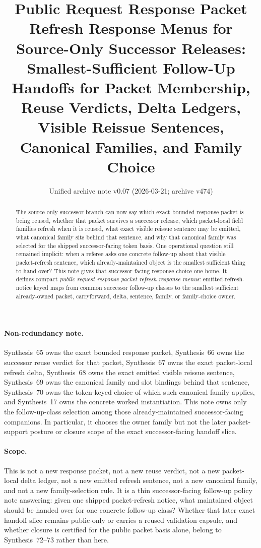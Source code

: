 \documentclass[11pt]{article}
\title{Public Request Response Packet Refresh Response Menus for Source-Only Successor Releases:\\[0.5ex]
\large Smallest-Sufficient Follow-Up Handoffs for Packet Membership, Reuse Verdicts, Delta Ledgers, Visible Reissue Sentences, Canonical Families, and Family Choice}
\author{}
\date{Unified archive note v0.07 (2026-03-21; archive v474)}
\begin{document}
\maketitle

\begin{abstract}
The source-only successor branch can now say which exact bounded response packet is being reused, whether that packet survives a successor release, which packet-local field families refresh when it is reused, what exact visible reissue sentence may be emitted, what canonical family sits behind that sentence, and why that canonical family was selected for the shipped successor-facing token basis. One operational question still remained implicit: when a referee asks one concrete follow-up about that visible packet-refresh sentence, which already-maintained object is the smallest sufficient thing to hand over? This note gives that successor-facing response choice one home. It defines compact \emph{public request response packet refresh response menus}: emitted-refresh-notice keyed maps from common successor follow-up classes to the smallest sufficient already-owned packet, carryforward, delta, sentence, family, or family-choice owner.
\end{abstract}

\paragraph{Non-redundancy note.}
Synthesis~65 owns the exact bounded response packet, Synthesis~66 owns the successor reuse verdict for that packet, Synthesis~67 owns the exact packet-local refresh delta, Synthesis~68 owns the exact emitted visible reissue sentence, Synthesis~69 owns the canonical family and slot bindings behind that sentence, Synthesis~70 owns the token-keyed choice of which such canonical family applies, and Synthesis~17 owns the concrete worked instantiation.\cite{series:publicrequestresponsepackets,series:publicrequestresponsepacketcarryforward,series:publicrequestresponsepacketdeltas,series:publicrequestresponsepacketrefreshnotices,series:publicrequestresponsepacketrefreshnoticenormalforms,series:publicrequestresponsepacketrefreshnoticeselections,series:workedexample}
This note owns only the follow-up-class selection among those already-maintained successor-facing companions. In particular, it chooses the owner family but not the later packet-support posture or closure scope of the exact successor-facing handoff slice.

\paragraph{Scope.}
This is not a new response packet, not a new reuse verdict, not a new packet-local delta ledger, not a new emitted refresh sentence, not a new canonical family, and not a new family-selection rule.
It is a thin successor-facing follow-up policy note answering: given one shipped packet-refresh notice, what maintained object should be handed over for one concrete follow-up class? Whether that later exact handoff slice remains public-only or carries a reused validation capsule, and whether closure is certified for the public packet basis alone, belong to Synthesis~72--73 rather than here.
\end{document}
